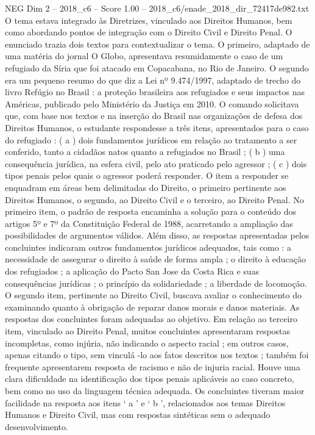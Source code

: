 \begin{textsample}{NEG Dim 2 – 2018\_c6 – Score 1.00 – 2018\_c6/enade\_2018\_dir\_72417de982.txt}
O tema estava integrado às Diretrizes, vinculado aos Direitos Humanos, bem como abordando pontos de integração com o Direito Civil e Direito Penal.
O enunciado trazia dois textos para contextualizar o tema.
O primeiro, adaptado de uma matéria do jornal O Globo, apresentava resumidamente o caso de um refugiado da Síria que foi atacado em Copacabana, no Rio de Janeiro.
O segundo era um pequeno resumo do que diz a Lei nº 9.474/1997, adaptado de trecho do livro Refúgio no Brasil : a proteção brasileira aos refugiados e seus impactos nas Américas, publicado pelo Ministério da Justiça em 2010.
O comando solicitava que, com base nos textos e na inserção do Brasil nas organizações de defesa dos Direitos Humanos, o estudante respondesse a três itens, apresentados para o caso do refugiado : ( a ) dois fundamentos jurídicos em relação ao tratamento a ser conferido, tanto a cidadãos natos quanto a refugiados no Brasil ; ( b ) uma consequência jurídica, na esfera civil, pelo ato praticado pelo agressor ; ( c ) dois tipos penais pelos quais o agressor poderá responder.
O item a responder se enquadram em áreas bem delimitadas do Direito, o primeiro pertinente aos Direitos Humanos, o segundo, ao Direito Civil e o terceiro, ao Direito Penal.
No primeiro item, o padrão de resposta encaminha a solução para o conteúdo dos artigos 5º e 7º da Constituição Federal de 1988, acarretando a ampliação das possibilidades de argumentos válidos.
Além disso, as respostas apresentadas pelos concluintes indicaram outros fundamentos jurídicos adequados, tais como : a necessidade de assegurar o direito à saúde de forma ampla ; o direito à educação dos refugiados ; a aplicação do Pacto San Jose da Costa Rica e suas consequências jurídicas ; o princípio da solidariedade ; a liberdade de locomoção.
O segundo item, pertinente ao Direito Civil, buscava avaliar o conhecimento do examinando quanto à obrigação de reparar danos morais e danos materiais.
As respostas dos concluintes foram adequadas ao objetivo.
Em relação ao terceiro item, vinculado ao Direito Penal, muitos concluintes apresentaram respostas incompletas, como injúria, não indicando o aspecto racial ; em outros casos, apenas citando o tipo, sem vinculá -lo aos fatos descritos nos textos ; também foi frequente apresentarem resposta de racismo e não de injuria racial.
Houve uma clara dificuldade na identificação dos tipos penais aplicáveis ao caso concreto, bem como no uso da linguagem técnica adequada.
Os concluintes tiveram maior facilidade na resposta aos itens ‘ a ’ e ‘ b ’, relacionados aos temas Direitos Humanos e Direito Civil, mas com respostas sintéticas sem o adequado desenvolvimento.

\end{textsample}
